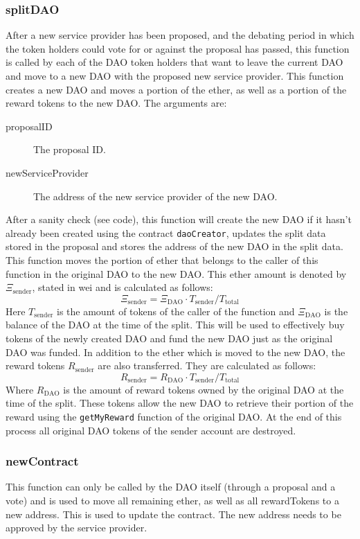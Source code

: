 \documentclass[9pt,oneside]{amsart}
\begin{document}
\begin{multicols}{2}
\subsubsection*{splitDAO}
After a new service provider has been proposed, and the debating period in which the token holders could vote for or against the proposal has passed, this function is called by each of the DAO token holders that want to leave the current DAO and move to a new DAO with the proposed new service provider. This function creates a new DAO and moves a portion of the ether, as well as a portion of the reward tokens to the new DAO.
The arguments are:
\begin{description}
 \item[proposalID] The proposal ID.
 \item[newServiceProvider] The address of the new service provider of the new DAO.
\end{description}
After a sanity check (see code), this function will create the new DAO if it hasn’t already been created using the contract \verb|daoCreator|, updates the split data stored in the proposal and stores the address of the new DAO in the split data.
This function moves the portion of ether that belongs to the caller of this function in the original DAO to the new DAO. This ether amount is denoted by $\Xi_{\text{sender}}$, stated in wei and is calculated as follows:
\begin{equation}
 \Xi_{\text{sender}} = \Xi_{\text{DAO}} \cdot T_{\text{sender}} / T_{\text{total}}
\end{equation}
Here $T_{\text{sender}}$ is the amount of tokens of the caller of the function and $\Xi_{\text{DAO}}$ is the balance of the DAO at the time of the split.
This will be used to effectively buy tokens of the newly created DAO and fund the new DAO just as the original DAO was funded.
In addition to the ether which is moved to the new DAO, the reward tokens $R_{\text{sender}}$ are also transferred. 
They are calculated as follows:
\begin{equation}
 R_{\text{sender}} = R_{\text{DAO}} \cdot T_{\text{sender}} / T_{\text{total}}
\end{equation}
Where $R_{\text{DAO}}$ is the amount of reward tokens owned by the original DAO at the time of the split. These tokens allow the new DAO to retrieve their portion of the reward using the \verb|getMyReward| function of the original DAO.
At the end of this process all original DAO tokens of the sender account are destroyed.

\subsubsection*{newContract}
This function can only be called by the DAO itself (through a proposal and a vote) and is used to move all remaining ether, as well as all rewardTokens to a new address. This is used to update the contract. The new address needs to be approved by the service provider.


\end{multicols}
\end{document}
